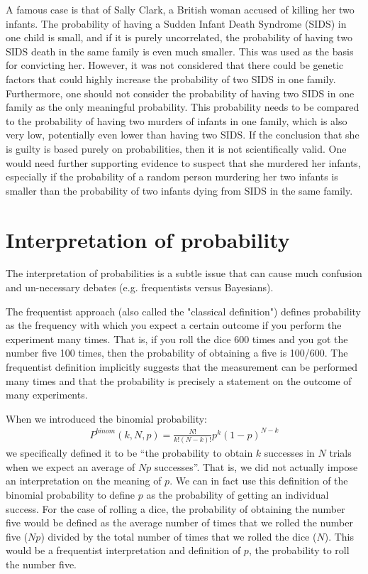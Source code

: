 A famous case is that of Sally Clark, a British woman accused of killing her two infants. The probability of having a Sudden Infant Death Syndrome (SIDS) in one child is small, and if it is purely uncorrelated, the probability of having two SIDS death in the same family is even much smaller.  This was used as the basis for convicting her. However, it was not considered that there could be genetic factors that could highly increase the probability of two SIDS in one family. Furthermore, one should not consider the probability of having two SIDS in one family as the only meaningful probability. This probability needs to be compared to the probability of having two murders of infants in one family, which is also very low, potentially even lower than having two SIDS. If the conclusion that she is guilty is based purely on probabilities, then it is not scientifically valid. One would need further supporting evidence to suspect that she murdered her infants, especially if the probability of a random person murdering her two infants is smaller than the probability of two infants dying from SIDS in the same family.


\section{Interpretation of probability}
The interpretation of probabilities is a subtle issue that can cause much confusion and un-necessary debates (e.g. frequentists versus Bayesians).

The frequentist approach (also called the "classical definition") defines probability as the frequency with which you expect a certain outcome if you perform the experiment many times. That is, if you roll the dice 600 times and you got the number five 100 times, then the probability of obtaining a five is 100/600. The frequentist definition implicitly suggests that the measurement can be performed many times and that the probability is precisely a statement on the outcome of many experiments.

When we introduced the binomial probability:
\begin{align}
P^{binom}(k,N,p)=\frac{N!}{k!(N-k)!}p^k(1-p)^{N-k}
\end{align}
we specifically defined it to be ``the probability to obtain $k$ successes in $N$ trials when we expect an average of $Np$ successes''. That is, we did not actually impose an interpretation on the meaning of $p$. We can in fact use this definition of the binomial probability to define  $p$ as the probability of getting an individual success. For the case of rolling a dice, the probability of obtaining the number five would be defined as the average number of times that we rolled the number five ($Np$) divided by the total number of times that we rolled the dice ($N$). This would be a frequentist interpretation and definition of $p$, the probability to roll the number five.

